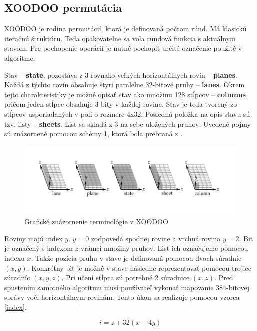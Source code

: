 \subsection{XOODOO permutácia}
XOODOO je rodina permutácií, ktorá je definovaná počtom rúnd. Má klasickú iteračnú štruktúru. Teda opakovateľne sa vola rundová funkcia s aktuálnym stavom. Pre pochopenie operácií je nutné pochopiť určité označenie použité v algoritme.

Stav -- \textbf{state}, pozostáva z 3 rovnako veľkých horizontálnych rovín -- \textbf{planes}. Každá z týchto rovín obsahuje štyri paralelne 32-bitové pruhy -- \textbf{lanes}. Okrem tejto charakteristiky je možné opísať stav ako množinu 128 stĺpcov -- \textbf{columns}, pričom jeden stĺpec obsahuje 3 bity v každej rovine. Stav je teda tvorený zo stĺpcov usporiadaných v poli o rozmere 4x32. Posledná položka na opis stavu sú tzv. listy -- \textbf{sheets}. List sa skladá z 3 na sebe uložených pruhov. Uvedené pojmy sú znázornené pomocou schémy \ref{xoodooterm}, ktorá bola prebraná z \cite{xcb}.

\begin{figure}[!h]
	\centering
	\includegraphics[width=1\textwidth]{figures/xoodooTerminology}
	\caption{Grafické znázornenie terminológie v XOODOO}
	\label{xoodooterm}
\end{figure}

Roviny majú index $y$. $y=0$ zodpovedá spodnej rovine a vrchná rovina $y=2$. Bit je označený s indexom $z$ vrámci množiny pruhov. List ich označujeme pomocou indexu $x$. Takže pozícia pruhu v stave je definovaná pomocou dvoch súradníc $(x,y)$. Konkrétny bit je možné v stave následne reprezentovať pomocou trojice súradníc $(x,y,z)$. Pri učení stĺpca sú potrebné 2 súradnice $(x,z)$. Pred spustením samotného algoritmu musí používateľ vykonať mapovanie 384-bitovej správy voči horizontálnym rovinám. Tento úkon sa realizuje pomocou vzorca \ref{index}.

\begin{equation}\label{index}
	i=z+32(x+4y)
\end{equation}

